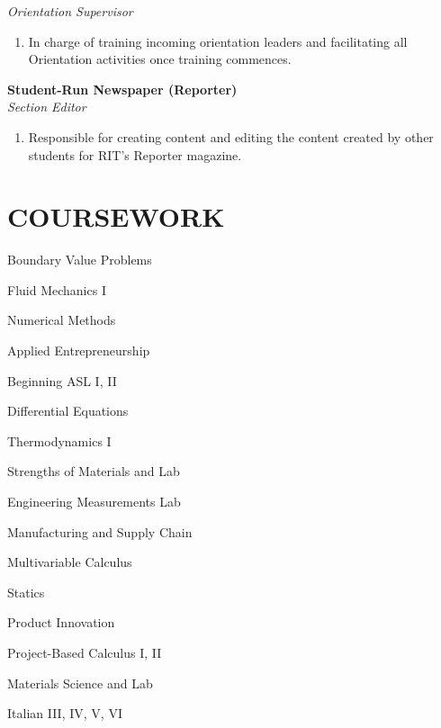\documentclass[line, resmargin]{res}
\begin{document}
\begin{resume}
\vspace{-6mm}

 \textit {Orientation Supervisor}
 \vspace{-6mm}
	\begin{enumerate}
		\item[]In charge of training incoming orientation leaders and facilitating all Orientation activities once training commences.
		\end{enumerate}
\vspace{-4mm}
\textbf{Student-Run Newspaper (Reporter)}\\
\textit {Section Editor}
\vspace{-6mm}
	\begin{enumerate}
		\item[]Responsible for creating content and editing the content created by other students for RIT’s Reporter magazine.
	\end{enumerate}
\vspace{-2.5mm}
\section{COURSEWORK}
      \begin{enumerate*}[series=MyList, before=\hspace{-0.6ex}, label=\textbullet]
        \item Boundary Value Problems
        \item Fluid Mechanics I
        \item Numerical Methods
        \item Applied Entrepreneurship
        \item Beginning ASL I, II
        \item Differential Equations
        \item Thermodynamics I
        \item Strengths of Materials and Lab
        \item Engineering Measurements Lab
        \item Manufacturing and Supply Chain
        \item Multivariable Calculus
        \item Statics
        \item Product Innovation
        \item Project-Based Calculus I, II
        \item Materials Science and Lab
        \item Italian III, IV, V, VI
      \end{enumerate*}

 
\end{resume}
\end{document}
